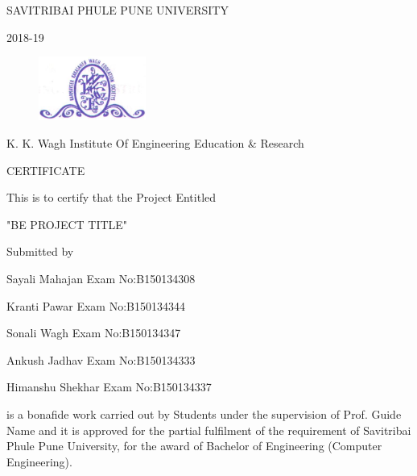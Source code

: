 \documentclass[oneside,a4paper,12pt]{report}
\begin{document}
\newpage





{\bfseries \fontsize{12}{12} \selectfont \centerline{SAVITRIBAI PHULE PUNE UNIVERSITY }
}

{\bfseries \fontsize{12}{12} \selectfont \centerline{2018-19}
\vspace*{1\baselineskip}}

\begin{figure}[ht]
\centering
\includegraphics[width=100pt]{collegelogo.png}
\end{figure}

{\bfseries \fontsize{14}{12} \selectfont \centerline{K. K. Wagh Institute Of Engineering Education \& Research}
\vspace*{1\baselineskip}} 


{\bfseries \fontsize{14}{12} \selectfont \centerline{CERTIFICATE} 
} 

\centerline{This is to certify that the Project Entitled}
\vspace*{1\baselineskip} 


{\bfseries \fontsize{12}{12} \selectfont \centerline{"BE PROJECT TITLE"}
\vspace*{1\baselineskip}}

\centerline{Submitted by}
\vspace*{1\baselineskip} 
\centerline{Sayali Mahajan  \hspace{25 mm} Exam No:B150134308 } 
\centerline{Kranti Pawar \hspace{25 mm} Exam No:B150134344  } 
\centerline{Sonali Wagh \hspace{25 mm} Exam No:B150134347 }
\centerline{Ankush Jadhav \hspace{25 mm} Exam No:B150134333 }
\centerline{Himanshu Shekhar \hspace{25 mm} Exam No:B150134337 }
\vspace*{1\baselineskip} 
is a bonafide work carried out by Students under the supervision of Prof. Guide Name and it is approved for the partial fulfilment of the requirement of Savitribai Phule Pune University, for the award of  Bachelor of Engineering (Computer Engineering).\\
\end{document}
